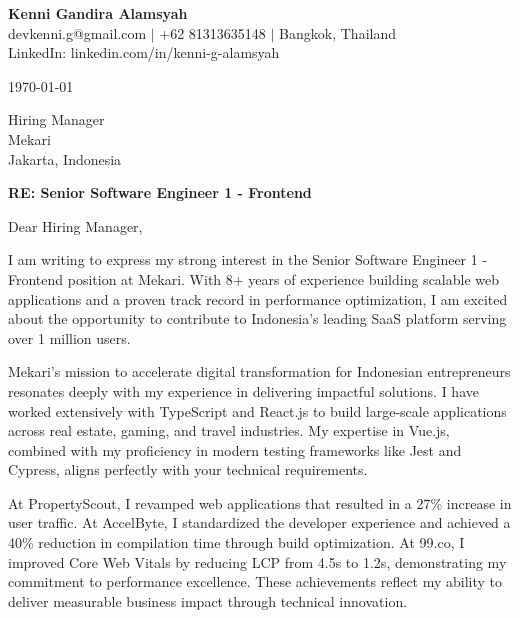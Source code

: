 \documentclass[11pt]{article}
\begin{document}
\begin{flushleft}
\textbf{\Large Kenni Gandira Alamsyah} \\[0.3em]
devkenni.g@gmail.com $|$ +62 81313635148 $|$ Bangkok, Thailand \\
LinkedIn: linkedin.com/in/kenni-g-alamsyah
\end{flushleft}

\vspace{1.5em}

\begin{flushleft}
\today
\end{flushleft}

\vspace{1em}

\begin{flushleft}
Hiring Manager \\
Mekari \\
Jakarta, Indonesia
\end{flushleft}

\vspace{1em}

\textbf{RE: Senior Software Engineer 1 - Frontend}

\vspace{1em}

Dear Hiring Manager,

I am writing to express my strong interest in the Senior Software Engineer 1 - Frontend position at Mekari. With 8+ years of experience building scalable web applications and a proven track record in performance optimization, I am excited about the opportunity to contribute to Indonesia's leading SaaS platform serving over 1 million users.

Mekari's mission to accelerate digital transformation for Indonesian entrepreneurs resonates deeply with my experience in delivering impactful solutions. I have worked extensively with TypeScript and React.js to build large-scale applications across real estate, gaming, and travel industries. My expertise in Vue.js, combined with my proficiency in modern testing frameworks like Jest and Cypress, aligns perfectly with your technical requirements.

At PropertyScout, I revamped web applications that resulted in a 27\% increase in user traffic. At AccelByte, I standardized the developer experience and achieved a 40\% reduction in compilation time through build optimization. At 99.co, I improved Core Web Vitals by reducing LCP from 4.5s to 1.2s, demonstrating my commitment to performance excellence. These achievements reflect my ability to deliver measurable business impact through technical innovation.
\end{document}
